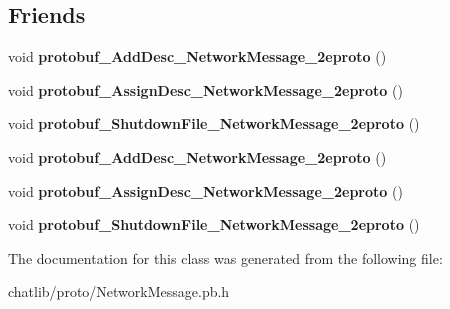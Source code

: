 \subsection*{Friends}
\begin{DoxyCompactItemize}
\item 
\hypertarget{classSimpleChat_1_1NetworkMessageHeader_a3486afd4adb1bba7588d52e4aabbca06}{void {\bfseries protobuf\-\_\-\-Add\-Desc\-\_\-\-Network\-Message\-\_\-2eproto} ()}\label{classSimpleChat_1_1NetworkMessageHeader_a3486afd4adb1bba7588d52e4aabbca06}

\item 
\hypertarget{classSimpleChat_1_1NetworkMessageHeader_af845200205064a98818e47c69988e43b}{void {\bfseries protobuf\-\_\-\-Assign\-Desc\-\_\-\-Network\-Message\-\_\-2eproto} ()}\label{classSimpleChat_1_1NetworkMessageHeader_af845200205064a98818e47c69988e43b}

\item 
\hypertarget{classSimpleChat_1_1NetworkMessageHeader_a5dd630836c26acd95825919f5d81def4}{void {\bfseries protobuf\-\_\-\-Shutdown\-File\-\_\-\-Network\-Message\-\_\-2eproto} ()}\label{classSimpleChat_1_1NetworkMessageHeader_a5dd630836c26acd95825919f5d81def4}

\item 
\hypertarget{classSimpleChat_1_1NetworkMessageHeader_a3486afd4adb1bba7588d52e4aabbca06}{void {\bfseries protobuf\-\_\-\-Add\-Desc\-\_\-\-Network\-Message\-\_\-2eproto} ()}\label{classSimpleChat_1_1NetworkMessageHeader_a3486afd4adb1bba7588d52e4aabbca06}

\item 
\hypertarget{classSimpleChat_1_1NetworkMessageHeader_af845200205064a98818e47c69988e43b}{void {\bfseries protobuf\-\_\-\-Assign\-Desc\-\_\-\-Network\-Message\-\_\-2eproto} ()}\label{classSimpleChat_1_1NetworkMessageHeader_af845200205064a98818e47c69988e43b}

\item 
\hypertarget{classSimpleChat_1_1NetworkMessageHeader_a5dd630836c26acd95825919f5d81def4}{void {\bfseries protobuf\-\_\-\-Shutdown\-File\-\_\-\-Network\-Message\-\_\-2eproto} ()}\label{classSimpleChat_1_1NetworkMessageHeader_a5dd630836c26acd95825919f5d81def4}

\end{DoxyCompactItemize}


The documentation for this class was generated from the following file\-:\begin{DoxyCompactItemize}
\item 
chatlib/proto/Network\-Message.\-pb.\-h\end{DoxyCompactItemize}
